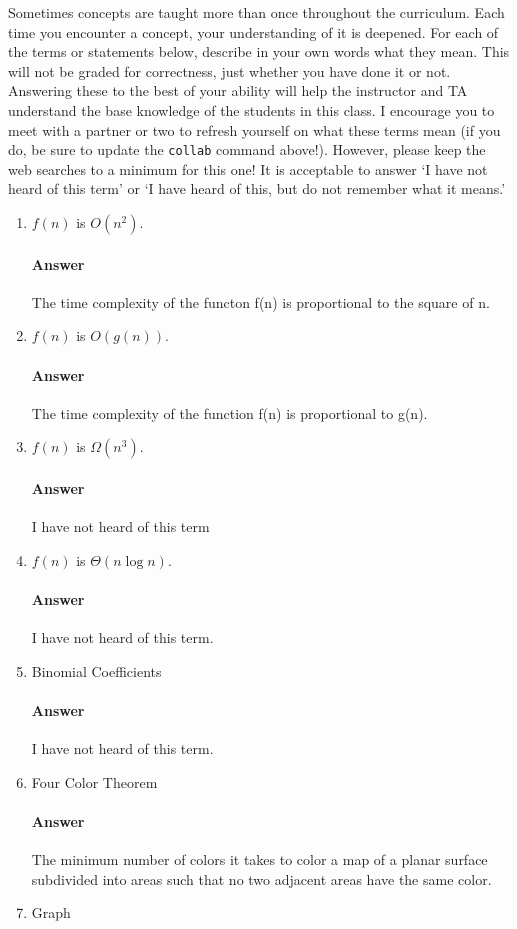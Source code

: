 \documentclass{article}
\begin{document}
Sometimes concepts are taught more than once throughout the curriculum.  Each
time you encounter a concept, your understanding of it is deepened.
For each of the terms or statements below, describe in your own words what they
mean.  This will not be graded for correctness, just whether you have done it or
not.  Answering these to the best of your ability will help the instructor and
TA understand the base knowledge of the students in this class.
I encourage you to meet with a partner or two to refresh yourself on what these
terms mean (if you do, be sure to update the \texttt{collab} command
above!).  However, please keep the web searches to a minimum for this one!  It
is acceptable to answer `I have not heard of this term' or `I have heard of
this, but do not remember what it means.'
\begin{enumerate}
    \item $f(n)$ is $O(n^2)$.
	\paragraph{Answer} The time complexity of the functon f(n) is proportional to the square of n.
    \item $f(n)$ is $O(g(n))$.
	\paragraph{Answer} The time complexity of the function f(n) is proportional to g(n).
    \item $f(n)$ is $\Omega(n^3)$.
	\paragraph{Answer} I have not heard of this term
    \item $f(n)$ is $\Theta(n\log n)$.
	\paragraph{Answer} I have not heard of this term.
    \item Binomial Coefficients
	\paragraph{Answer} I have not heard of this term.
    \item Four Color Theorem
	\paragraph{Answer} The minimum number of colors it takes to color a map of a planar surface subdivided into areas such that no two adjacent areas have the same color.
    \item Graph

\end{enumerate}
\end{document}

